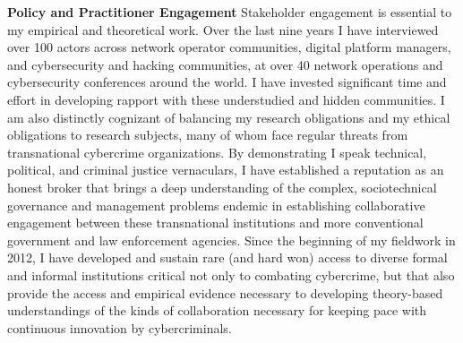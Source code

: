 \documentclass[11pt]{letter}
\begin{document}
\begin{letter}
\textbf{Policy and Practitioner Engagement} \vspace{0.2 \baselineskip} \newline %
%
Stakeholder engagement is essential to my empirical and theoretical work.
%
Over the last nine years I have interviewed over 100 actors across network
operator communities, digital platform managers, and cybersecurity and hacking communities, at over 40 network operations and cybersecurity conferences around the world.
%
I have invested significant time and effort in developing rapport with these  understudied and hidden communities.
%
I am also distinctly cognizant of balancing my research obligations and my ethical obligations to research subjects, many of whom face regular threats from transnational cybercrime organizations.
%
%
By demonstrating I speak technical, political, and criminal justice vernaculars, I have established a reputation as an honest broker that brings a deep understanding of the complex, sociotechnical governance and management problems endemic in establishing collaborative engagement between these transnational institutions and more conventional government and law enforcement agencies.
%
Since the beginning of my fieldwork in 2012, I have developed and sustain rare (and hard won) access to diverse formal and informal institutions critical not only to combating cybercrime, but that also provide the access and empirical evidence necessary to developing theory-based understandings of the kinds of collaboration necessary for keeping pace with continuous innovation by cybercriminals.



\end{letter}
\end{document}
